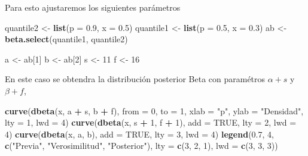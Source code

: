 \documentclass[
  12pt,
]{book}
\newenvironment{Shaded}{\begin{snugshade}}{\end{snugshade}}
\newcommand{\DataTypeTok}[1]{\textcolor[rgb]{0.13,0.29,0.53}{#1}}
\newcommand{\DecValTok}[1]{\textcolor[rgb]{0.00,0.00,0.81}{#1}}
\newcommand{\FloatTok}[1]{\textcolor[rgb]{0.00,0.00,0.81}{#1}}
\newcommand{\KeywordTok}[1]{\textcolor[rgb]{0.13,0.29,0.53}{\textbf{#1}}}
\newcommand{\NormalTok}[1]{#1}
\newcommand{\OperatorTok}[1]{\textcolor[rgb]{0.81,0.36,0.00}{\textbf{#1}}}
\newcommand{\OtherTok}[1]{\textcolor[rgb]{0.56,0.35,0.01}{#1}}
\newcommand{\StringTok}[1]{\textcolor[rgb]{0.31,0.60,0.02}{#1}}
\theoremstyle{definition}
\theoremstyle{definition}
\theoremstyle{definition}
\theoremstyle{remark}
\begin{document}
Para esto ajustaremos los siguientes parámetros

\begin{Shaded}
\begin{Highlighting}[]
\NormalTok{quantile2 <-}\StringTok{ }\KeywordTok{list}\NormalTok{(}\DataTypeTok{p =} \FloatTok{0.9}\NormalTok{, }\DataTypeTok{x =} \FloatTok{0.5}\NormalTok{)}
\NormalTok{quantile1 <-}\StringTok{ }\KeywordTok{list}\NormalTok{(}\DataTypeTok{p =} \FloatTok{0.5}\NormalTok{, }\DataTypeTok{x =} \FloatTok{0.3}\NormalTok{)}
\NormalTok{ab <-}\StringTok{ }\KeywordTok{beta.select}\NormalTok{(quantile1, quantile2)}

\NormalTok{a <-}\StringTok{ }\NormalTok{ab[}\DecValTok{1}\NormalTok{]}
\NormalTok{b <-}\StringTok{ }\NormalTok{ab[}\DecValTok{2}\NormalTok{]}
\NormalTok{s <-}\StringTok{ }\DecValTok{11}
\NormalTok{f <-}\StringTok{ }\DecValTok{16}
\end{Highlighting}
\end{Shaded}

En este caso se obtendra la distribución posterior Beta con paramétros
\(\alpha + s\) y \(\beta + f\),

\begin{Shaded}
\begin{Highlighting}[]
\KeywordTok{curve}\NormalTok{(}\KeywordTok{dbeta}\NormalTok{(x, a }\OperatorTok{+}\StringTok{ }\NormalTok{s, b }\OperatorTok{+}\StringTok{ }\NormalTok{f), }\DataTypeTok{from =} \DecValTok{0}\NormalTok{, }\DataTypeTok{to =} \DecValTok{1}\NormalTok{, }\DataTypeTok{xlab =} \StringTok{"p"}\NormalTok{, }
    \DataTypeTok{ylab =} \StringTok{"Densidad"}\NormalTok{, }\DataTypeTok{lty =} \DecValTok{1}\NormalTok{, }\DataTypeTok{lwd =} \DecValTok{4}\NormalTok{)}
\KeywordTok{curve}\NormalTok{(}\KeywordTok{dbeta}\NormalTok{(x, s }\OperatorTok{+}\StringTok{ }\DecValTok{1}\NormalTok{, f }\OperatorTok{+}\StringTok{ }\DecValTok{1}\NormalTok{), }\DataTypeTok{add =} \OtherTok{TRUE}\NormalTok{, }\DataTypeTok{lty =} \DecValTok{2}\NormalTok{, }
    \DataTypeTok{lwd =} \DecValTok{4}\NormalTok{)}
\KeywordTok{curve}\NormalTok{(}\KeywordTok{dbeta}\NormalTok{(x, a, b), }\DataTypeTok{add =} \OtherTok{TRUE}\NormalTok{, }\DataTypeTok{lty =} \DecValTok{3}\NormalTok{, }\DataTypeTok{lwd =} \DecValTok{4}\NormalTok{)}
\KeywordTok{legend}\NormalTok{(}\FloatTok{0.7}\NormalTok{, }\DecValTok{4}\NormalTok{, }\KeywordTok{c}\NormalTok{(}\StringTok{"Previa"}\NormalTok{, }\StringTok{"Verosimilitud"}\NormalTok{, }\StringTok{"Posterior"}\NormalTok{), }
    \DataTypeTok{lty =} \KeywordTok{c}\NormalTok{(}\DecValTok{3}\NormalTok{, }\DecValTok{2}\NormalTok{, }\DecValTok{1}\NormalTok{), }\DataTypeTok{lwd =} \KeywordTok{c}\NormalTok{(}\DecValTok{3}\NormalTok{, }\DecValTok{3}\NormalTok{, }\DecValTok{3}\NormalTok{))}
\end{Highlighting}
\end{Shaded}
\end{document}
